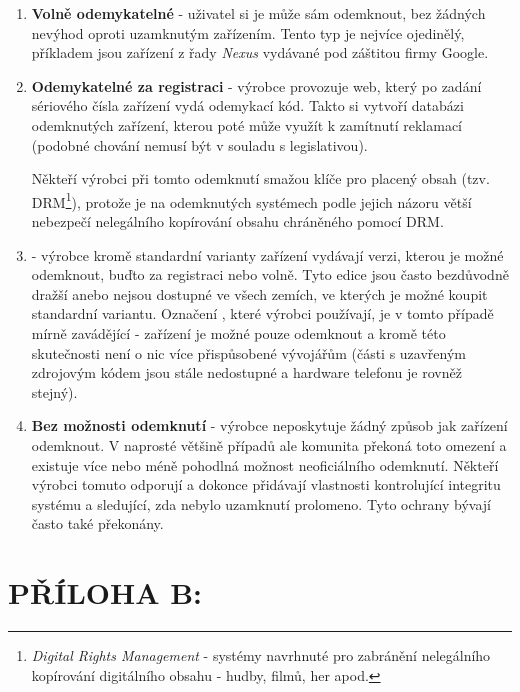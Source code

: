 \documentclass[12pt, a4paper, oneside]{article}
\newcommand{\B}{\textbf} %
\newcommand{\It}{\textit}  %
\begin{document}
\begin{enumerate}
    \item \B{Volně odemykatelné} - uživatel si je může sám odemknout, bez žádných nevýhod oproti uzamknutým zařízením. Tento typ je nejvíce ojedinělý, příkladem jsou zařízení z řady \It{Nexus} vydávané pod záštitou firmy Google.
    
    \item \B{Odemykatelné za registraci} - výrobce provozuje web, který po zadání sériového čísla zařízení vydá odemykací kód. Takto si vytvoří databázi odemknutých zařízení, kterou poté může využít k zamítnutí reklamací (podobné chování nemusí být v souladu s legislativou).
    
    Někteří výrobci při tomto odemknutí smažou klíče pro placený obsah (tzv. DRM\footnote{\It{Digital Rights Management} - systémy navrhnuté pro zabránění nelegálního kopírování digitálního obsahu - hudby, filmů, her apod.}), protože je na odemknutých systémech podle jejich názoru větší nebezpečí nelegálního kopírování obsahu chráněného pomocí DRM.
    
    \item \B{} - výrobce kromě standardní varianty zařízení vydávají verzi, kterou je možné odemknout, buďto za registraci nebo volně. Tyto edice jsou často bezdůvodně dražší anebo nejsou dostupné ve všech zemích, ve kterých je možné koupit standardní variantu. Označení , které výrobci používají, je v tomto případě mírně zavádějící - zařízení je možné pouze odemknout a kromě této skutečnosti není o nic více přispůsobené vývojářům (části s uzavřeným zdrojovým kódem jsou stále nedostupné a hardware telefonu je rovněž stejný).

    \item \B{Bez možnosti odemknutí} - výrobce neposkytuje žádný způsob jak zařízení odemknout. V naprosté většině případů ale komunita překoná toto omezení a existuje více nebo méně pohodlná možnost neoficiálního odemknutí. Někteří výrobci tomuto odporují a dokonce přidávají vlastnosti kontrolující integritu systému a sledující, zda nebylo uzamknutí prolomeno. Tyto ochrany bývají často také překonány.
    
\end{enumerate}

\newpage
\section*{PŘÍLOHA B:}
\end{document}
